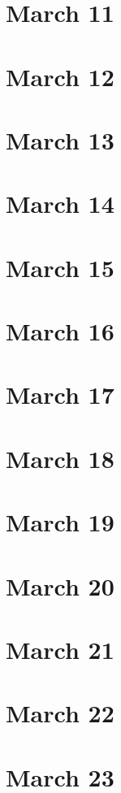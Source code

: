 \section{March 11}

\section{March 12}

\section{March 13}

\section{March 14}

\section{March 15}

\section{March 16}

\section{March 17}

\section{March 18}

\section{March 19}

\section{March 20}

\section{March 21}

\section{March 22}

\section{March 23}

